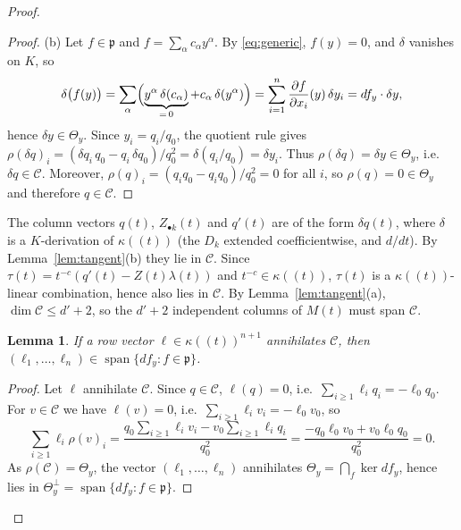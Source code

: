 \documentclass[pdflatex,sn-mathphys-num]{sn-jnl}
\numberwithin{equation}{section}
\theoremstyle{thmstyleone}
\newtheorem{lemma}[theorem]{Lemma}
\theoremstyle{thmstyletwo}
\begin{document}
\begin{proof}
\begin{proof}
(b) Let $f\in\mathfrak p$ and $f = \sum_\alpha c_\alpha y^\alpha$. By \eqref{eq:generic}, $f(y)=0$, and $\delta$ vanishes on
$K$, so
\[\delta\bigl(f(y)\bigr)
=\sum_\alpha\Bigl(\underbrace{y^\alpha\,\delta(c_\alpha)}_{=\,0}+c_\alpha\,\delta(y^\alpha)\Bigr)
=\sum_{i=1}^n\frac{\partial f}{\partial x_i}(y)\,\delta y_i
=df_y\cdot\delta y,\] hence
$\delta y\in\Theta_y$. Since $y_i=q_i/q_0$, the quotient rule gives
$\rho(\delta q)_i=(\delta q_i\,q_0-q_i\,\delta q_0)/q_0^2=\delta(q_i/q_0)=\delta y_i$.
Thus $\rho(\delta q)=\delta y\in\Theta_y$, i.e.\ $\delta q\in\mathcal C$. Moreover, $\rho(q)_i=(q_iq_0-q_iq_0)/q_0^2=0$ for all $i$, so $\rho(q)=0\in\Theta_y$
and therefore $q\in\mathcal C$.

\end{proof}

The column vectors $q(t)$, $Z_{\bullet k}(t)$ and $q'(t)$ are of the form $\delta q(t)$, where
$\delta$ is a $K$-derivation of $\kappa((t))$ (the $D_k$ extended
coefficientwise, and $d/dt$). By Lemma~\ref{lem:tangent}(b) they lie in $\mathcal C$. Since
$\tau(t)=t^{-c}(q'(t)-Z(t)\lambda(t))$ and $t^{-c}\in\kappa((t))$, $\tau(t)$ is a
$\kappa((t))$-linear combination, hence also lies in $\mathcal C$. By Lemma~\ref{lem:tangent}(a), $\dim \mathcal C\le {d'}+2$, so the ${d'}+2$ independent columns of $M(t)$ must span $\mathcal C$.\\

\begin{lemma}\label{lem:ell}
If a row vector $\ell\in\kappa((t))^{n+1}$ annihilates $\mathcal C$, then
$(\ell_1,\dots,\ell_n)\in\operatorname{span}\{df_y:f\in\mathfrak p\}$.
\end{lemma}
\begin{proof}
Let $\ell$ annihilate $\mathcal C$. Since $q\in\mathcal C$, $\ell(q)=0$, i.e.\
$\sum_{i\ge1}\ell_iq_i=-\ell_0q_0$. For $v\in\mathcal C$ we have $\ell(v)=0$, i.e.\
$\sum_{i\ge1}\ell_iv_i=-\ell_0v_0$, so
\[ \sum_{i\ge1}\ell_i\rho(v)_i
 =\frac{q_0\sum_{i\ge1}\ell_iv_i-v_0\sum_{i\ge1}\ell_iq_i}{q_0^2}
 =\frac{-q_0\ell_0v_0+v_0\ell_0q_0}{q_0^2}=0 .\]
As $\rho(\mathcal C)=\Theta_y$, the vector $(\ell_1,\dots,\ell_n)$ annihilates
$\Theta_y=\bigcap_f\ker df_y$, hence lies in
$\Theta_y^\perp=\operatorname{span}\{df_y:f\in\mathfrak p\}$.
\end{proof}


\end{proof}
\end{document}
